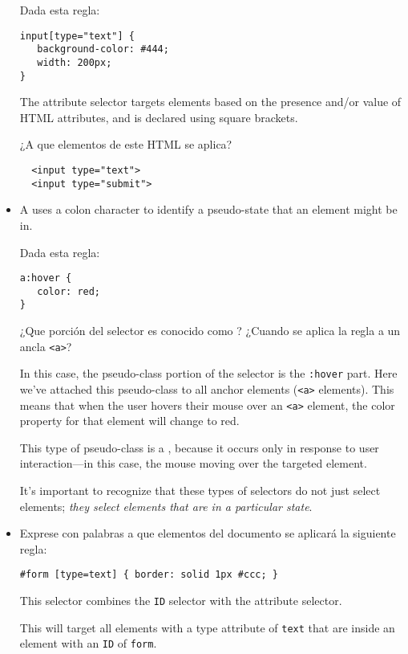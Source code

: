 \begin{exercise}
\begin{itemize}
Dada esta regla:
\begin{verbatim}
input[type="text"] {
   background-color: #444;
   width: 200px;
}
\end{verbatim}
The attribute selector targets elements based on the presence and/or value of HTML attributes, and is declared using square brackets.

¿A que elementos de este HTML se aplica?
\begin{verbatim}
  <input type="text">
  <input type="submit">
\end{verbatim}
\item A  
uses a colon character to identify a pseudo-state that an element might be in.


Dada esta regla:
\begin{verbatim}
a:hover {
   color: red;
}
\end{verbatim}
¿Que porción del selector es conocido como ?
¿Cuando se aplica la regla a un ancla \verb|<a>|?

In this case, the pseudo-class portion of the selector is the \verb|:hover| part. 
Here we've attached this pseudo-class to all anchor elements 
(\verb|<a>| elements). 
This means that when the user hovers their mouse
over an \verb|<a>| element, the color property for that element will change to red. 

This type of pseudo-class is a , 
because it occurs only in response to user interaction—in this case,
the mouse moving over the targeted element.

It's important to recognize that these types of selectors do not just select elements; 
\emph{they select elements that are in a particular state}. 

\item 

Exprese con palabras a que elementos del documento se aplicará la siguiente regla:
\begin{verbatim}
#form [type=text] { border: solid 1px #ccc; }
\end{verbatim}

This selector combines the \verb|ID| selector with the attribute selector. 

This will target all elements with a type attribute of \verb|text| that are inside an element with an \verb|ID| of 
\verb|form|.

\end{itemize}
\end{exercise}

